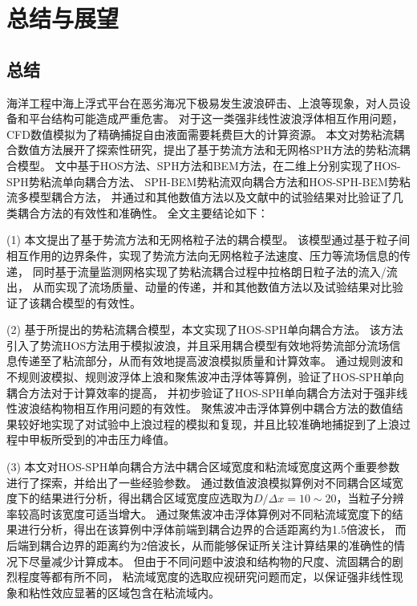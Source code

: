 \section{
  \texorpdfstring{总结与展望} %
  {\thesection 总结与展望} %
}
\label{sec:总结与展望}

\subsection{
  \texorpdfstring{总结} %
  {\thesubsection 总结} %
}
\label{ssec:总结}

海洋工程中海上浮式平台在恶劣海况下极易发生波浪砰击、上浪等现象，对人员设备和平台结构可能造成严重危害。%
对于这一类强非线性波浪浮体相互作用问题，CFD数值模拟为了精确捕捉自由液面需要耗费巨大的计算资源。%
本文对势粘流耦合数值方法展开了探索性研究，提出了基于势流方法和无网格SPH方法的势粘流耦合模型。%
文中基于HOS方法、SPH方法和BEM方法，在二维上分别实现了HOS-SPH势粘流单向耦合方法、%
SPH-BEM势粘流双向耦合方法和HOS-SPH-BEM势粘流多模型耦合方法，%
并通过和其他数值方法以及文献中的试验结果对比验证了几类耦合方法的有效性和准确性。%
全文主要结论如下：%

(1)	本文提出了基于势流方法和无网格粒子法的耦合模型。%
该模型通过基于粒子间相互作用的边界条件，实现了势流方法向无网格粒子法速度、压力等流场信息的传递，%
同时基于流量监测网格实现了势粘流耦合过程中拉格朗日粒子法的流入/流出，%
从而实现了流场质量、动量的传递，并和其他数值方法以及试验结果对比验证了该耦合模型的有效性。%

(2)	基于所提出的势粘流耦合模型，本文实现了HOS-SPH单向耦合方法。%
该方法引入了势流HOS方法用于模拟波浪，并且采用耦合模型有效地将势流部分流场信息传递至了粘流部分，从而有效地提高波浪模拟质量和计算效率。%
通过规则波和不规则波模拟、规则波浮体上浪和聚焦波冲击浮体等算例，验证了HOS-SPH单向耦合方法对于计算效率的提高，%
并初步验证了HOS-SPH单向耦合方法对于强非线性波浪结构物相互作用问题的有效性。%
聚焦波冲击浮体算例中耦合方法的数值结果较好地实现了对试验中上浪过程的模拟和复现，并且比较准确地捕捉到了上浪过程中甲板所受到的冲击压力峰值。%

(3)	本文对HOS-SPH单向耦合方法中耦合区域宽度和粘流域宽度这两个重要参数进行了探索，并给出了一些经验参数。%
通过数值波浪模拟算例对不同耦合区域宽度下的结果进行分析，得出耦合区域宽度应选取为$D/\Delta x = 10 \sim 20$，当粒子分辨率较高时该宽度可适当增大。%
通过聚焦波冲击浮体算例对不同粘流域宽度下的结果进行分析，得出在该算例中浮体前端到耦合边界的合适距离约为1.5倍波长，%
而后端到耦合边界的距离约为2倍波长，从而能够保证所关注计算结果的准确性的情况下尽量减少计算成本。%
但由于不同问题中波浪和结构物的尺度、流固耦合的剧烈程度等都有所不同，%
粘流域宽度的选取应视研究问题而定，以保证强非线性现象和粘性效应显著的区域包含在粘流域内。%

